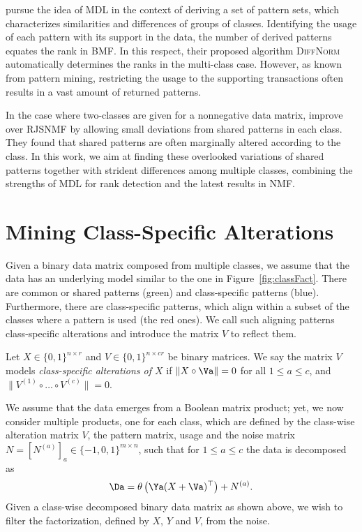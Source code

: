 \cite{vreeken2007characterising} pursue the idea of MDL in the context of deriving a set of pattern sets, which characterizes similarities and differences of groups of classes. Identifying the usage of each pattern with its support in the data, the number of derived patterns equates the rank in BMF. In this respect, their proposed algorithm \textsc{DiffNorm} automatically determines the ranks in the multi-class case. However, as known from pattern mining, restricting the usage to the supporting transactions often results in a vast amount of returned patterns.    

In the case where two-classes are given for a nonnegative data matrix, \cite{kim2015simultaneous} improve over RJSNMF by allowing small deviations from shared patterns in each class. They found that shared patterns are often marginally altered according to the class. In this work, we aim at finding these overlooked variations of shared patterns together with strident differences among multiple classes, combining the strengths of MDL for rank detection and the latest results in NMF.
\section{Mining Class-Specific Alterations}
Given a binary data matrix composed from multiple classes, we assume that the data has an underlying model similar to the one in Figure~\ref{fig:classFact}. There are common or shared patterns (green) and class-specific patterns (blue). Furthermore, there are class-specific patterns, which align within a subset of the classes where a pattern is used (the red ones). We call such aligning patterns class-specific alterations and introduce the matrix $V$ to reflect them.
\begin{definition}\label{def:CS:classSpecAlt}
Let $X\in\{0,1\}^{n\times r}$ and $V\in \{0,1\}^{n\times cr}$ be binary matrices.
We say the matrix $V$ models \emph{class-specific alterations of $X$} if $\|X\circ \Va\|=0$ for all $1\leq a\leq c$, and $\|V^{(1)}\circ\ldots\circ V^{(c)}\|=0$.
\end{definition}
We assume that the data emerges from a Boolean matrix product; yet, we now consider multiple products, one for each class, which are defined by the class-wise alteration matrix $V$, the pattern matrix, usage and the noise matrix $N=[N^{(a)}]_a\in\{-1,0,1\}^{m\times n}$, such that for $1\leq a\leq c$ the data is decomposed as
\begin{align}\label{eq:CS:VBMF}
\Da= \theta\left(\Ya(X+\Va)^\top \right) +N^{(a)}.
\end{align}
Given a class-wise decomposed binary data matrix as shown above, we wish to filter the factorization, defined by $X$, $Y$ and $V$, from the noise.
